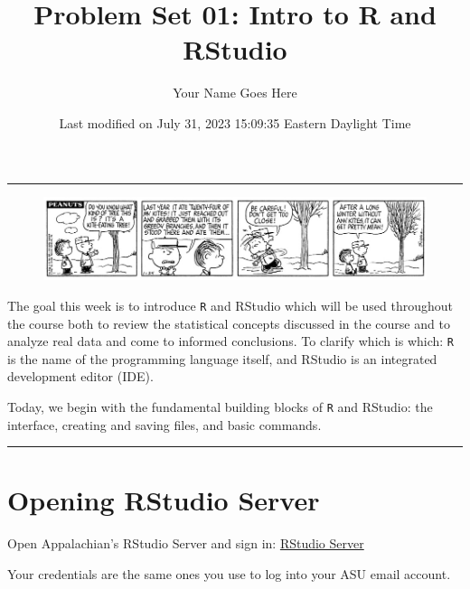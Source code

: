 \documentclass[
  letterpaper,
  DIV=11,
  numbers=noendperiod]{scrartcl}
\title{Problem Set 01: Intro to R and RStudio}
\author{Your Name Goes Here}
\date{Last modified on July 31, 2023 15:09:35 Eastern Daylight Time}
\begin{document}
\maketitle
\ifdefined\Shaded\renewenvironment{Shaded}{\begin{tcolorbox}[interior hidden, sharp corners, frame hidden, boxrule=0pt, breakable, borderline west={3pt}{0pt}{shadecolor}, enhanced]}{\end{tcolorbox}}\fi

\begin{center}\rule{0.5\linewidth}{0.5pt}\end{center}

\begin{figure}

{\centering \includegraphics[width=7.14in,height=\textheight]{./figures/cbrown.jpg}

}

\end{figure}

The goal this week is to introduce \texttt{R} and RStudio which will be
used throughout the course both to review the statistical concepts
discussed in the course and to analyze real data and come to informed
conclusions. To clarify which is which: \texttt{R} is the name of the
programming language itself, and RStudio is an integrated development
editor (IDE).

Today, we begin with the fundamental building blocks of \texttt{R} and
RStudio: the interface, creating and saving files, and basic commands.

\begin{center}\rule{0.5\linewidth}{0.5pt}\end{center}

\hypertarget{opening-rstudio-server}{%
\section{Opening RStudio Server}\label{opening-rstudio-server}}

Open Appalachian's RStudio Server and sign in:
\href{https://mathr.appstate.edu}{RStudio Server}

Your credentials are the same ones you use to log into your ASU email
account.
\end{document}
